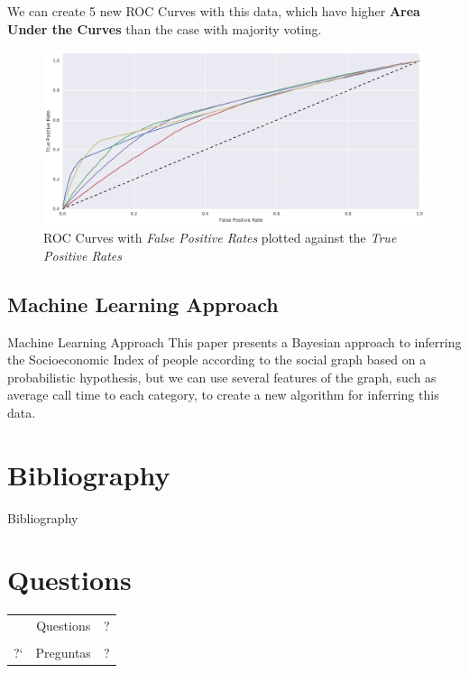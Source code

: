 \documentclass{beamer}
\begin{document}
\begin{frame}
	We can create 5 new ROC Curves with this data, which have higher \textbf{Area Under the Curves} than the case with majority voting.

	\begin{figure}
		\includegraphics[height=.6\textheight]{ROC_multiclass_wide.png}
		\caption{ROC Curves with \textit{False Positive Rates} plotted against the \textit{True Positive Rates}}
	\end{figure}
\end{frame}

\subsection{Machine Learning Approach}
\begin{frame}{Machine Learning Approach}
	This paper presents a Bayesian approach to inferring the Socioeconomic Index of people according to the social graph based on a probabilistic hypothesis, but we can use several features of the graph, such as average call time to each category, to create a new algorithm for inferring this data.
\end{frame}

\section{Bibliography}

\begin{frame}{Bibliography}

\renewcommand*{\bibfont}{\footnotesize}
\printbibliography{}

\end{frame}

\section{Questions}

\begin{frame}
	\Huge
	\begin{center}
	\begin{tabular}{@{}r@{}c@{}l@{}}
		&Questions&?\scalebox{.8}{?\scalebox{.8}{?\scalebox{.8}{?\scalebox{.8}{?\scalebox{.8}{?\scalebox{.8}{?}}}}}} \\
		&&\\
		\scalebox{.8}{\scalebox{.8}{\scalebox{.8}{\scalebox{.8}{\scalebox{.8}{\scalebox{.8}{?`}?`}?`}?`}?`}?`}?`&Preguntas&?\scalebox{.8}{?\scalebox{.8}{?\scalebox{.8}{?\scalebox{.8}{?\scalebox{.8}{?\scalebox{.8}{?}}}}}}
	\end{tabular}
	\end{center}
\end{frame}
\end{document}
